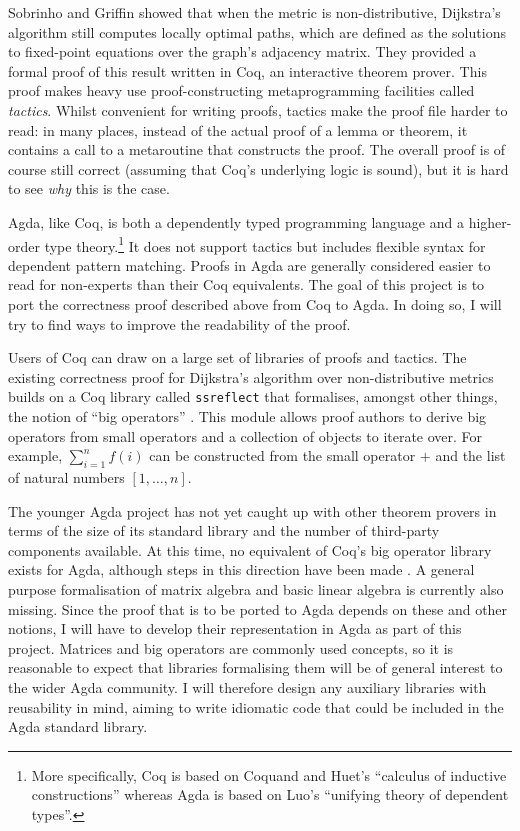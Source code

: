 \documentclass[a4paper]{scrartcl}
\begin{document}
Sobrinho and Griffin showed that when the metric is non-distributive, Dijkstra's algorithm still computes locally optimal paths, which are defined as the solutions to fixed-point equations over the graph's adjacency matrix. They provided a formal proof of this result written in Coq, an interactive theorem prover. This proof makes heavy use proof-constructing metaprogramming facilities called \emph{tactics}. Whilst convenient for writing proofs, tactics make the proof file harder to read: in many places, instead of the actual proof of a lemma or theorem, it contains a call to a metaroutine that constructs the proof. The overall proof is of course still correct (assuming that Coq's underlying logic is sound), but it is hard to see \emph{why} this is the case.

Agda, like Coq, is both a dependently typed programming language and a higher-order type theory.\footnote{More specifically, Coq is based on Coquand and Huet's \enquote{calculus of inductive constructions} whereas Agda is based on Luo's \enquote{unifying theory of dependent types}.} It does not support tactics but includes flexible syntax for dependent pattern matching. Proofs in Agda are generally considered easier to read for non-experts than their Coq equivalents. The goal of this project is to port the correctness proof described above from Coq to Agda. In doing so, I will try to find ways to improve the readability of the proof.

Users of Coq can draw on a large set of libraries of proofs and tactics. The existing correctness proof for Dijkstra's algorithm over non-distributive metrics builds on a Coq library called \texttt{ssreflect} that formalises, amongst other things, the notion of \enquote{big operators} \autocite{bertot_canonical_2008}. This module allows proof authors to derive big operators from small operators and a collection of objects to iterate over. For example, \(\sum_{i=1}^n f(i)\) can be constructed from the small operator \(+\) and the list of natural numbers \([1, \dots, n]\).

The younger Agda project has not yet caught up with other theorem provers in terms of the size of its standard library and the number of third-party components available. At this time, no equivalent of Coq's big operator library exists for Agda, although steps in this direction have been made \autocite{gustafsson_foldable_2014}. A general purpose formalisation of matrix algebra and basic linear algebra is currently also missing. Since the proof that is to be ported to Agda depends on these and other notions, I will have to develop their representation in Agda as part of this project. Matrices and big operators are commonly used concepts, so it is reasonable to expect that libraries formalising them will be of general interest to the wider Agda community. I will therefore design any auxiliary libraries with reusability in mind, aiming to write idiomatic code that could be included in the Agda standard library.
\end{document}
